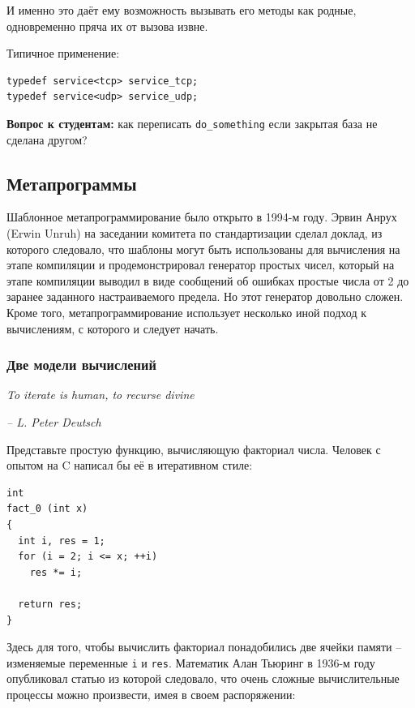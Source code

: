 \documentclass[a4paper,12pt,oneside]{article}
\newif\ifanswers
\begin{document}
И именно это даёт ему возможность вызывать его методы как родные, одновременно пряча их от вызова извне.

Типичное применение:

\begin{lstlisting}
typedef service<tcp> service_tcp;
typedef service<udp> service_udp;
\end{lstlisting}

\textbf{Вопрос к студентам:} как переписать \lstinline!do_something! если закрытая база не сделана другом?

\ifanswers
Как вариант: \lstinline!transport_type::send(....);!
\fi

\pagebreak
\subsection{Метапрограммы}

Шаблонное метапрограммирование было открыто в 1994-м году. Эрвин Анрух (Erwin Unruh) на заседании комитета по стандартизации сделал доклад, из которого следовало, что шаблоны могут быть использованы для вычисления на этапе компиляции и продемонстрировал генератор простых чисел, который на этапе компиляции выводил в виде сообщений об ошибках простые числа от 2 до заранее заданного настраиваемого предела. Но этот генератор довольно сложен. Кроме того, метапрограммирование использует несколько иной подход к вычислениям, с которого и следует начать.

\subsubsection{Две модели вычислений}\label{ComputationModels}

\hfill\textit{To iterate is human, to recurse divine}{\vspace{0.5em}}

\hfill\textit{-- L. Peter Deutsch}

Представьте простую функцию, вычисляющую факториал числа. Человек с опытом на C написал бы её в итеративном стиле:

\begin{lstlisting}
int
fact_0 (int x)
{
  int i, res = 1;
  for (i = 2; i <= x; ++i)
    res *= i;

  return res;
}
\end{lstlisting}

Здесь для того, чтобы вычислить факториал понадобились две ячейки памяти -- изменяемые переменные \lstinline!i! и \lstinline!res!. Математик Алан Тьюринг в 1936-м году опубликовал статью из которой следовало, что очень сложные вычислительные процессы можно произвести, имея в своем распоряжении:
\end{document}
